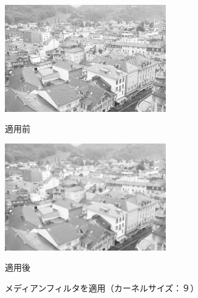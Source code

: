 \documentclass{jsarticle}
\begin{document}
\begin{figure}[htbp]
 \begin{minipage}{0.5\hsize}
  \begin{center}
   \includegraphics[width=70mm]{town.png}
  \end{center}
  \caption{適用前}
  \label{fig:one}
 \end{minipage}
 \begin{minipage}{0.5\hsize}
  \begin{center}
   \includegraphics[width=70mm]{output_median_9.png}
  \end{center}
  \caption{適用後}
  \label{fig:two}
 \end{minipage}
 \caption{メディアンフィルタを適用（カーネルサイズ：９）}
\end{figure}
\end{document}
